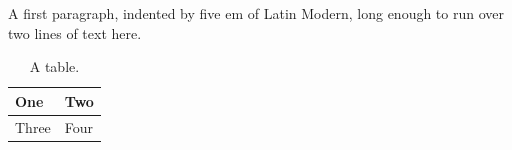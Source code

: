 \documentclass{article}
\begin{document}
A first paragraph, indented by five em of Latin Modern, long enough to run over two lines of text here.

\begin{table}[h]
\centering
\begin{tabular}{ll}
\toprule
One & Two \\
\midrule
Three & Four \\
\bottomrule
\end{tabular}
\caption{A table.}
\end{table}
\end{document}
